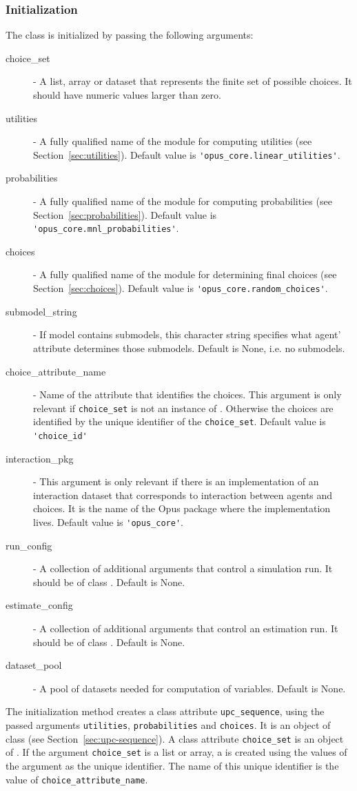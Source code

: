 \subsubsection{Initialization}
%
The class is initialized by passing the following arguments:
\begin{description}
\item[choice_set] - A list, array or dataset that represents the finite set of
  possible choices. It should have numeric values larger than zero.
\item[utilities] - A fully qualified name of the module for computing utilities
  (see Section~\ref{sec:utilities}). Default value is
  \verb|'opus_core.linear_utilities'|.
\item[probabilities] - A fully qualified name of the module for computing
  probabilities (see Section~\ref{sec:probabilities}). Default value is
  \verb|'opus_core.mnl_probabilities'|.
\item[choices] - A fully qualified name of the module for determining
  final choices (see Section~\ref{sec:choices}). Default value is
  \verb|'opus_core.random_choices'|.
\item[submodel_string] - If model contains submodels, this character string
  specifies what agent' attribute determines those submodels. Default is None, i.e. no submodels.
\item[choice_attribute_name] - Name of the attribute that identifies the
  choices. This argument is only relevant if \verb|choice_set| is not an
  instance of . Otherwise the choices are identified by the
  unique identifier of the \verb|choice_set|. Default value is
  \verb|'choice_id'|
\item[interaction_pkg] - This argument is only relevant if there is an
  implementation of an interaction dataset that corresponds to interaction
  between agents and choices. It is the name of the Opus package where the implementation lives.
  Default value is \verb|'opus_core'|.
\item[run_config] - A collection of additional arguments that control a
  simulation run. It should be of class . Default is None.
\item[estimate_config] - A collection of additional arguments that control an
  estimation run. It should be of class . Default is None.
\item[dataset_pool] - A pool of datasets needed for computation of variables. Default is None.
\end{description}
The initialization method creates a class attribute \verb|upc_sequence|, using
the passed arguments \verb|utilities|, \verb|probabilities| and
\verb|choices|. It is an object of class  (see
Section~\ref{sec:upc-sequence}). A class attribute \verb|choice_set| is an
object of . If the argument \verb|choice_set| is a list or
array, a  is created using the values of the argument as the
unique identifier. The name of this unique identifier is the value of \verb|choice_attribute_name|.

